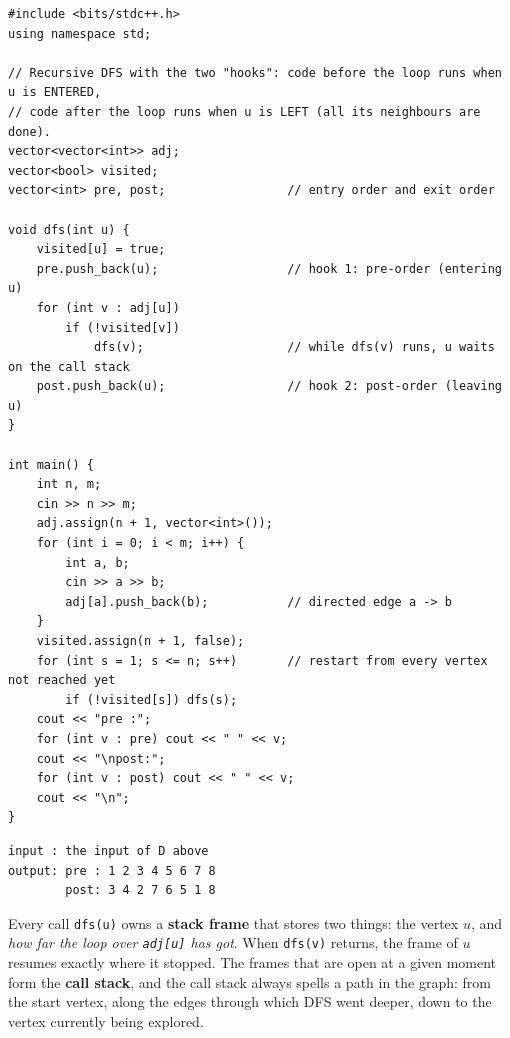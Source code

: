 \begin{lstlisting}[style=cpp]
#include <bits/stdc++.h>
using namespace std;

// Recursive DFS with the two "hooks": code before the loop runs when u is ENTERED,
// code after the loop runs when u is LEFT (all its neighbours are done).
vector<vector<int>> adj;
vector<bool> visited;
vector<int> pre, post;                 // entry order and exit order

void dfs(int u) {
    visited[u] = true;
    pre.push_back(u);                  // hook 1: pre-order (entering u)
    for (int v : adj[u])
        if (!visited[v])
            dfs(v);                    // while dfs(v) runs, u waits on the call stack
    post.push_back(u);                 // hook 2: post-order (leaving u)
}

int main() {
    int n, m;
    cin >> n >> m;
    adj.assign(n + 1, vector<int>());
    for (int i = 0; i < m; i++) {
        int a, b;
        cin >> a >> b;
        adj[a].push_back(b);           // directed edge a -> b
    }
    visited.assign(n + 1, false);
    for (int s = 1; s <= n; s++)       // restart from every vertex not reached yet
        if (!visited[s]) dfs(s);
    cout << "pre :";
    for (int v : pre) cout << " " << v;
    cout << "\npost:";
    for (int v : post) cout << " " << v;
    cout << "\n";
}
\end{lstlisting}

\begin{lstlisting}[style=trace]
input : the input of D above
output: pre : 1 2 3 4 5 6 7 8
        post: 3 4 2 7 6 5 1 8
\end{lstlisting}

Every call \texttt{dfs(u)} owns a \textbf{stack frame} that stores two things: the vertex $u$, and \emph{how far the loop over \texttt{adj[u]} has got}. When \texttt{dfs(v)} returns, the frame of $u$ resumes exactly where it stopped. The frames that are open at a given moment form the \textbf{call stack}, and the call stack always spells a path in the graph: from the start vertex, along the edges through which DFS went deeper, down to the vertex currently being explored.

